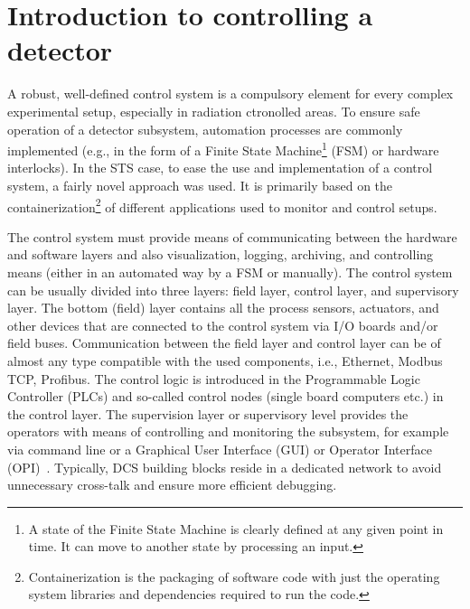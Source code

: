 \section{Introduction to controlling a detector}
A robust, well-defined control system is a compulsory element for every complex experimental setup, especially in radiation ctronolled areas. To ensure safe operation of a detector subsystem, automation processes are commonly implemented (e.g., in the form of a Finite State Machine\footnote{A state of the Finite State Machine is clearly defined at any given point in time. It can move to another state by processing an input.} (\gls{FSM}) or hardware interlocks). In the \gls{STS} case, to ease the use and implementation of a control system, a fairly novel approach was used. It is primarily based on the containerization\footnote{Containerization is the packaging of software code with just the operating system libraries and dependencies required to run the code.} of different applications used to monitor and control setups. 




The control system must provide means of communicating between the hardware and software layers and also visualization, logging, archiving, and controlling means (either in an automated way by a \gls{FSM} or manually). The control system can be usually divided into three layers: field layer, control layer, and supervisory layer. The bottom (field) layer contains all the process sensors, actuators, and other devices that are connected to the control system via I/O boards and/or field buses. Communication between the field layer and control layer can be of almost any type compatible with the used components, i.e., Ethernet, Modbus \gls{TCP}, Profibus. The control logic is introduced in the Programmable Logic Controller (\glspl{PLC}) and so-called control nodes (single board computers etc.) in the control layer. The supervision layer or supervisory level provides the operators with means of controlling and monitoring the subsystem, for example via command line or a Graphical User Interface (\gls{GUI}) or Operator Interface (\gls{OPI})~\cite{layers}.  Typically, DCS building blocks reside in a dedicated network to avoid unnecessary cross-talk and ensure more efficient debugging.

